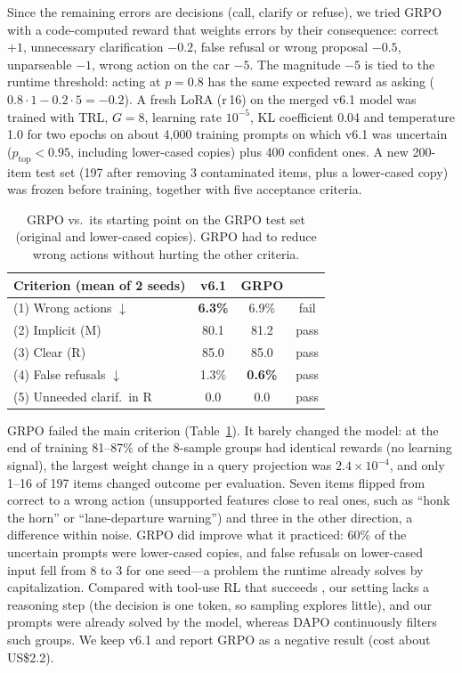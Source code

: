 Since the remaining errors are decisions (call, clarify or refuse), we tried GRPO \citep{shao2024deepseekmath} with a
code-computed reward that weights errors by their consequence: correct $+1$, unnecessary clarification $-0.2$, false refusal or
wrong proposal $-0.5$, unparseable $-1$, wrong action on the car $-5$. The magnitude $-5$ is tied to the runtime threshold:
acting at $p=0.8$ has the same expected reward as asking ($0.8\cdot1-0.2\cdot5=-0.2$). A fresh LoRA (r\,16) on the merged
v6.1 model was trained with TRL, $G=8$, learning rate $10^{-5}$, KL coefficient 0.04 and temperature 1.0 for two epochs on
about 4,000 training prompts on which v6.1 was uncertain ($p_{\text{top}}<0.95$, including lower-cased copies) plus 400
confident ones. A new 200-item test set (197 after removing 3 contaminated items, plus a lower-cased copy) was frozen before
training, together with five acceptance criteria.

\begin{table}[t]
\centering\small
\begin{tabular}{@{}lccc@{}}
\toprule
Criterion (mean of 2 seeds) & v6.1 & GRPO & \\
\midrule
(1) Wrong actions $\downarrow$ & \textbf{6.3\%} & 6.9\% & fail \\
(2) Implicit (M) & 80.1 & 81.2 & pass \\
(3) Clear (R) & 85.0 & 85.0 & pass \\
(4) False refusals $\downarrow$ & 1.3\% & \textbf{0.6\%} & pass \\
(5) Unneeded clarif.\ in R & 0.0 & 0.0 & pass \\
\bottomrule
\end{tabular}
\caption{GRPO vs.\ its starting point on the GRPO test set (original and lower-cased copies). GRPO had to reduce wrong actions
without hurting the other criteria.}
\label{tab:grpo}
\end{table}

GRPO failed the main criterion (Table~\ref{tab:grpo}). It barely changed the model: at the end of training 81--87\% of the
8-sample groups had identical rewards (no learning signal), the largest weight change in a query projection was
$2.4\times10^{-4}$, and only 1--16 of 197 items changed outcome per evaluation. Seven items flipped from correct to a wrong
action (unsupported features close to real ones, such as ``honk the horn'' or ``lane-departure warning'') and three in the
other direction, a difference within noise. GRPO did improve what it practiced: 60\% of the uncertain prompts were lower-cased
copies, and false refusals on lower-cased input fell from 8 to 3 for one seed---a problem the runtime already solves by
capitalization. Compared with tool-use RL that succeeds \citep{qian2025toolrl,zhang2025tooln1}, our setting lacks a reasoning
step (the decision is one token, so sampling explores little), and our prompts were already solved by the model, whereas DAPO
\citep{yu2025dapo} continuously filters such groups. We keep v6.1 and report GRPO as a negative result (cost about US\$2.2).
